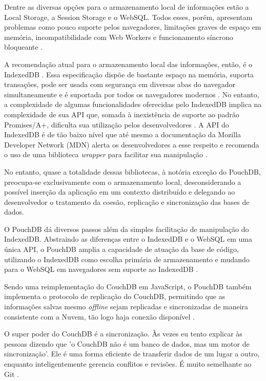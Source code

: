 \documentclass[
	article,			%
	12pt,				%
	oneside,			%
	a4paper,			%
	english,			%
	brazil,				%
	sumario=tradicional
	]{abntex2}
\begin{document}
Dentre as diversas opções para o armazenamento local de informações estão a Local Storage, a Session Storage e o WebSQL. Todos esses, porém, apresentam problemas como pouco suporte pelos navegadores, limitações graves de espaço em memória, incompatibilidade com Web Workers e funcionamento síncrono bloqueante \cite{osmani-cohen-2017}.

A recomendação atual para o armazenamento local das informações, então, é o IndexedDB \cite{osmani-cohen-2017}. Essa especificação dispõe de bastante espaço na memória, suporta transações, pode ser usada com segurança em diversas abas do navegador simultaneamente e é suportada por todos os navegadores modernos \cite{tabalin-2017}. No entanto, a complexidade de algumas funcionalidades oferecidas pelo IndexedDB implica na complexidade de sua API que, somada à inexistência de suporte ao padrão Promises/A+, dificulta sua utilização pelos desenvolvedores \cite{osmani-2016}. A API do IndexedDB é de tão baixo nível que até mesmo a documentação da Mozilla Developer Network (MDN) alerta os desenvolvedores a esse respeito e recomenda o uso de uma biblioteca \textit{wrapper} para facilitar sua manipulação \cite{smith-2016}.

No entanto, quase a totalidade dessas bibliotecas, à notória exceção do PouchDB, preocupa-se exclusivamente com o armazenamento local, desconsiderando a possível inserção da aplicação em um contexto distribuído e delegando ao desenvolvedor o tratamento da coesão, replicação e sincronização das bases de dados.

O PouchDB dá diversos passos além da simples facilitação de manipulação do IndexedDB. Abstraindo as diferenças entre o IndexedDB e o WebSQL em uma única API, o PouchDB amplia a capacidade de atuação da base de código, utilizando o IndexedDB como escolha primária de armazenamento e mudando para o WebSQL em navegadores sem suporte ao IndexedDB \cite{brown-2014}.

Sendo uma reimplementação do CouchDB em JavaScript, o PouchDB também implementa o protocolo de replicação do CouchDB, permitindo que as informações salvas mesmo \textit{offline} sejam replicadas e sincronizadas de maneira consistente com a Nuvem, tão logo haja conexão disponível \cite{pouchdb-2017}.

\begin{citacao}
	O super poder do CouchDB é a sincronização. Às vezes eu tento explicar às pessoas dizendo que 'o CouchDB não é um banco de dados, mas um motor de sincronização'. Ele é uma forma eficiente de transferir dados de um lugar a outro, enquanto inteligentemente gerencia conflitos e revisões. É muito semelhante ao Git \cite[tradução nossa]{lawson-2017}.
\end{citacao}
\end{document}
